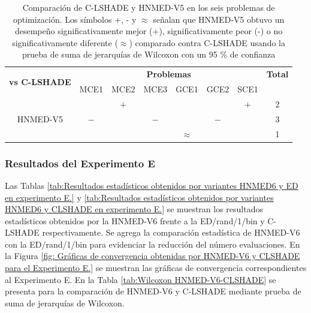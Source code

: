 \begin{table}
	\centering
	\caption[Comparación de C-LSHADE y HNMED-V5 en los seis problemas de optimización mediante la prueba de Suma de jerarquías de Wilcoxon]{Comparación de C-LSHADE y HNMED-V5 en los seis problemas de optimización. Los símbolos +, - y $\approx$ señalan que HNMED-V5 obtuvo un desempeño significativamente mejor (+), significativamente peor (-) o no significativamente diferente ($\approx$) comparado contra C-LSHADE usando la prueba de suma de jerarquías de Wilcoxon con un 95 \% de confianza} \label{tab:Wilcoxon HNMED-V5-CLSHADE}
	\begin{tabular}{cccccccc}
		\multirow{2}{*}{\textbf{vs C-LSHADE}} & \multicolumn{6}{c}{\textbf{Problemas}}           & \textbf{Total}  \\
		& MCE1 & MCE2 & MCE3 & GCE1 & GCE2 & SCE1 &        \\
		\hline
		\multirow{3}{*}{HNMED-V5}    &      &  $+$    &      &      &       & $ +$    &  2      \\
		&   $-$  &      &  $ -$   &      &  $ - $  &       & 3       \\
		&      &      &       &$\approx$ &  &        &    1
	\end{tabular}
\end{table}


\subsubsection{Resultados del Experimento E}
Las Tablas \ref{tab:Resultados estadísticos obtenidos por variantes HNMED6 y ED  en experimento E.} y \ref{tab:Resultados estadísticos obtenidos por variantes HNMED6 y CLSHADE  en experimento E.} se muestran los resultados estadísticos obtenidos por la HNMED-V6 frente a la ED/rand/1/bin y C-LSHADE respectivamente. Se agrega la comparación estadística de HNMED-V6 con la ED/rand/1/bin para evidenciar la reducción del número evaluaciones. En la Figura \ref{fig: Gráficas de convergencia obtenidas por HNMED-V6 y CLSHADE para el Experimento E.} se muestran las gráficas de convergencia correspondientes al Experimento E. En la Tabla \ref{tab:Wilcoxon HNMED-V6-CLSHADE} se presenta para la comparación de HNMED-V6 y C-LSHADE mediante prueba de suma de jerarquías de Wilcoxon.  

